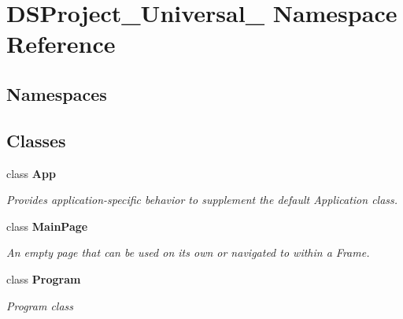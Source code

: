 \section{D\+S\+Project\+\_\+\+Universal\+\_\+ Namespace Reference}
\label{namespace_d_s_project___universal__}
\subsection*{Namespaces}
\begin{DoxyCompactItemize}
\end{DoxyCompactItemize}
\subsection*{Classes}
\begin{DoxyCompactItemize}
\item 
class \textbf{ App}
\begin{DoxyCompactList}\small\item\em Provides application-\/specific behavior to supplement the default Application class. \end{DoxyCompactList}\item 
class \textbf{ Main\+Page}
\begin{DoxyCompactList}\small\item\em An empty page that can be used on its own or navigated to within a Frame. \end{DoxyCompactList}\item 
class {\bfseries Program}
\begin{DoxyCompactList}\small\item\em Program class \end{DoxyCompactList}\end{DoxyCompactItemize}
